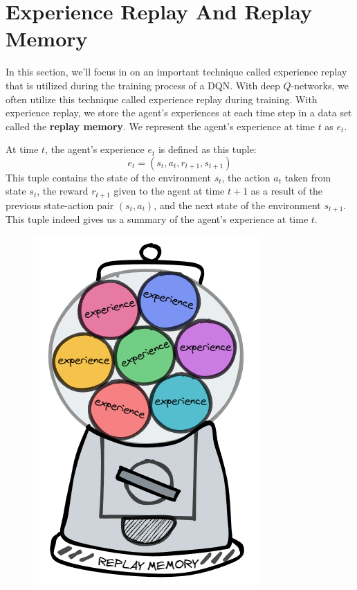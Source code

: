 %
\section{Experience Replay And Replay Memory}
%

In this section, we'll focus in on an important technique called experience replay 
that is utilized during the training process of a DQN. With deep $Q$-networks, we 
often utilize this technique called experience replay during training. With experience 
replay, we store the agent's experiences at each time step in a data set called the 
{\bf replay memory}. We represent the agent's experience at time $t$ as $e_t$.

At time $t$, the agent's experience $e_t$ is defined as this tuple:
$$
e_t = (s_t, a_t, r_{t+1}, s_{t+1})
$$
\noindent{}This tuple contains the state of the environment $s_t$, the action $a_t$ 
taken from state $s_t$, the reward $r_{t+1}$ given to the agent at time $t+1$ as a 
result of the previous state-action pair $(s_t, a_t)$, and the next state of the 
environment $s_{t+1}$. This tuple indeed gives us a summary of the agent's experience 
at time $t$.

\begin{figure}[h]
\centering
\includegraphics[scale=0.618]{pix/q_learning/replay_memory.png}
\end{figure}

